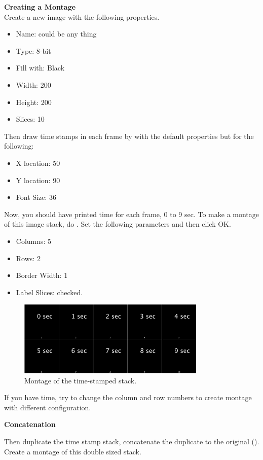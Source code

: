\begin{indentexercise}{1}
\textbf{Creating a Montage}\\
Create a new image  with the following properties. 
\begin{itemize}
\item Name: could be any thing
\item Type: 8-bit
\item Fill with: Black
\item Width: 200
\item Height: 200
\item Slices: 10
\end{itemize}
Then draw time stamps in each frame by  with the default properties but for the following:
\begin{itemize}
\item X location: 50
\item Y location: 90
\item Font Size: 36
\end{itemize}

Now, you should have printed time for each frame, 0 to 9 sec. To make a montage of this image stack, do . Set the following parameters and then click OK. 
\begin{itemize}
\item Columns: 5
\item Rows: 2
\item Border Width: 1
\item Label Slices: checked.
\end{itemize}

\begin{figure}[h!]
\begin{center}
\includegraphics[width=0.8\textwidth]{fig/TimeStampMontage.png}
\caption{Montage of the time-stamped stack.}
\label{fig:editStack2}
\end{center}
\end{figure}

If you have time, try to change the column and row numbers to create montage with different configuration. 

\textbf{Concatenation}

Then duplicate the time stamp stack, concatenate the duplicate to the original (). Create a montage of this double sized stack. 

\end{indentexercise}


